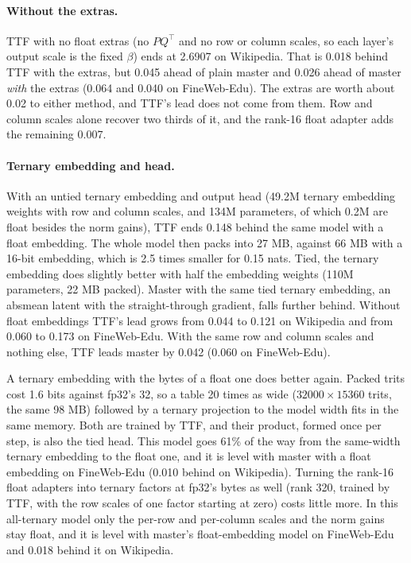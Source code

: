 \documentclass[10pt,twocolumn]{article}
\begin{document}
\paragraph{Without the extras.} TTF with no float extras (no $PQ^\top$ and no row or column scales, so each layer's
output scale is the fixed $\beta$) ends at 2.6907 on Wikipedia. That is 0.018 behind TTF with the extras, but 0.045
ahead of plain master and 0.026 ahead of master \emph{with} the extras (0.064 and 0.040 on FineWeb-Edu). The extras are
worth about 0.02 to either method, and TTF's lead does not come from them. Row and column scales alone recover two
thirds of it, and the rank-16 float adapter adds the remaining 0.007.

\paragraph{Ternary embedding and head.} With an untied ternary embedding and output head (49.2M ternary embedding
weights with row and column scales, and 134M parameters, of which 0.2M are float besides the norm gains), TTF ends 0.148
behind the same model with a float embedding. The whole model then packs into 27 MB, against 66 MB with a 16-bit
embedding, which is 2.5 times smaller for 0.15 nats. Tied, the ternary embedding does slightly better with half the
embedding weights (110M parameters, 22 MB packed). Master with the same tied ternary embedding, an absmean latent with
the straight-through gradient, falls further behind. Without float embeddings TTF's lead grows from 0.044 to 0.121 on
Wikipedia and from 0.060 to 0.173 on FineWeb-Edu. With the same row and column scales and nothing else, TTF leads master
by 0.042 (0.060 on FineWeb-Edu).

A ternary embedding with the bytes of a float one does better again. Packed trits cost 1.6 bits against fp32's 32, so
a table 20 times as wide ($32000\times15360$ trits, the same 98 MB) followed by a ternary projection to the model width
fits in the same memory. Both are trained by TTF, and their product, formed once per step, is also the tied head. This
model goes 61\% of the way from the same-width ternary embedding to the float one, and it is level with master with a
float embedding on FineWeb-Edu (0.010 behind on Wikipedia). Turning the rank-16 float adapters into ternary factors at
fp32's bytes as well (rank 320, trained by TTF, with the row scales of one factor starting at zero) costs little more.
In this all-ternary model only the per-row and per-column scales and the norm gains stay float, and it is level with
master's float-embedding model on FineWeb-Edu and 0.018 behind it on Wikipedia.
\end{document}
